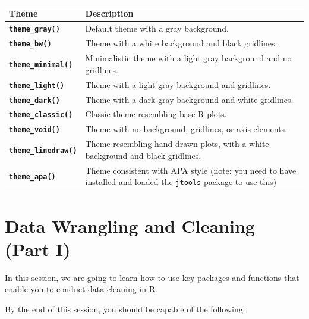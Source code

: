 \documentclass[
]{book}
\begin{document}
\begin{longtable}[]{@{}
  >{\raggedright\arraybackslash}p{}
  >{\raggedright\arraybackslash}p{}@{}}
\toprule\noalign{}
\begin{minipage}[b]{\linewidth}\raggedright
\textbf{Theme}
\end{minipage} & \begin{minipage}[b]{\linewidth}\raggedright
\textbf{Description}
\end{minipage} \\
\midrule\noalign{}
\endhead
\bottomrule\noalign{}
\endlastfoot
\textbf{\texttt{theme\_gray()}} & Default theme with a gray background. \\
\textbf{\texttt{theme\_bw()}} & Theme with a white background and black gridlines. \\
\textbf{\texttt{theme\_minimal()}} & Minimalistic theme with a light gray background and no gridlines. \\
\textbf{\texttt{theme\_light()}} & Theme with a light gray background and gridlines. \\
\textbf{\texttt{theme\_dark()}} & Theme with a dark gray background and white gridlines. \\
\textbf{\texttt{theme\_classic()}} & Classic theme resembling base R plots. \\
\textbf{\texttt{theme\_void()}} & Theme with no background, gridlines, or axis elements. \\
\textbf{\texttt{theme\_linedraw()}} & Theme resembling hand-drawn plots, with a white background and black gridlines. \\
\textbf{\texttt{theme\_apa()}} & Theme consistent with APA style (note: you need to have installed and loaded the \texttt{jtools} package to use this) \\
\end{longtable}

\chapter{\texorpdfstring{\textbf{Data Wrangling and Cleaning (Part I)}}{Data Wrangling and Cleaning (Part I)}}\label{datacleaning1}

In this session, we are going to learn how to use key packages and functions that enable you to conduct data cleaning in R.

By the end of this session, you should be capable of the following:
\end{document}
